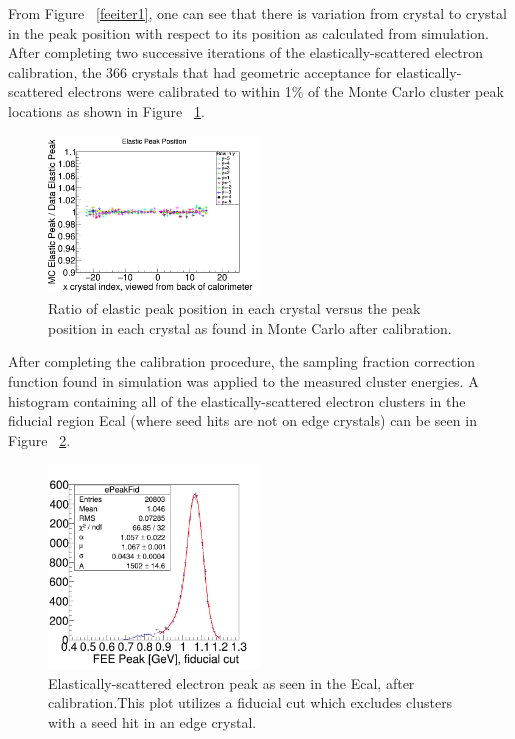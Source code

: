 \documentclass[twoside]{article}
\begin{document}
\begin{multicols}{2}
From Figure ~\ref{feeiter1}, one can see that there is variation from crystal to crystal in the peak position with respect to its position as calculated from simulation. After completing two successive iterations of the elastically-scattered electron calibration, the 366 crystals that had geometric acceptance for elastically-scattered electrons were calibrated to within 1\% of the Monte Carlo cluster peak locations as shown in Figure ~\ref{feeiter3}.  

\begin{figure}[H]
  \centering
      \includegraphics[width=0.5\textwidth]{pics/feeiter3.png}
  \caption{Ratio of elastic peak position in each crystal versus the peak position in each crystal as found in Monte Carlo after calibration.}
  \label{feeiter3}
\end{figure}

After completing the calibration procedure, the sampling fraction correction function found in simulation was applied to the measured cluster energies. A histogram containing all of the elastically-scattered electron clusters in the fiducial region Ecal (where seed hits are not on edge crystals) can be seen in Figure ~\ref{feeTotal}. 
	
\begin{figure}[H]
  \centering
      \includegraphics[width=0.5\textwidth]{pics/feerestotalX.png}
  \caption{Elastically-scattered electron peak as seen in the Ecal, after calibration.This plot utilizes a fiducial cut which excludes clusters with a seed hit in an edge crystal.}
  \label{feeTotal}
\end{figure} 
    

\end{multicols}
\end{document}
